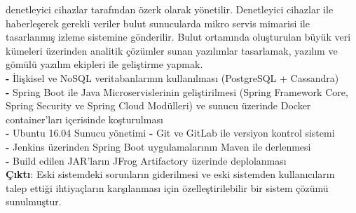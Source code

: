 \begin{multicols}{2}
{{{                denetleyici cihazlar tarafından özerk olarak yönetilir. Denetleyici cihazlar ile haberleşerek gerekli
                veriler bulut sunucularda mikro servis mimarisi ile tasarlanmış izleme sistemine gönderilir.
                Bulut ortamında oluşturulan büyük veri kümeleri üzerinden analitik çözümler sunan yazılımlar
                tasarlamak, yazılım ve gömülü yazılım ekipleri ile geliştirme yapmak. \\
                \textbf{-} İlişkisel ve NoSQL veritabanlarının kullanılması (PostgreSQL + Cassandra) \\
                \textbf{-} Spring Boot ile Java Microservislerinin geliştirilmesi
                (Spring Framework Core, Spring Security ve Spring Cloud Modülleri)
                ve sunucu üzerinde Docker container'ları içerisinde koşturulması \\
                \textbf{-} Ubuntu 16.04 Sunucu yönetimi
                \textbf{-} Git ve GitLab ile versiyon kontrol sistemi \\
                \textbf{-} Jenkins üzerinden Spring Boot uygulamalarının Maven ile derlenmesi \\
                \textbf{-} Build edilen JAR'ların  JFrog Artifactory üzerinde deplolanması  \\
                \textbf{Çıktı}: Eski sistemdeki sorunların giderilmesi ve eski sistemden
                kullanıcıların talep ettiği ihtiyaçların karşılanması için özelleştirilebilir
                bir sistem çözümü sunulmuştur.
            }
        }{
        }

}
\end{multicols}
